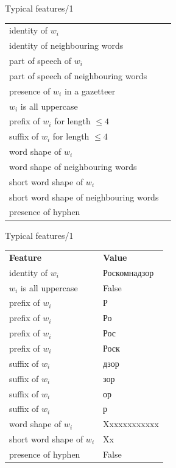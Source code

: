 \documentclass[10pt, compress]{beamer}
\begin{document}


\begin{frame}{Typical features/1}

\begin{tabular}{ll}
identity of $w_i$  &  \\
identity of neighbouring words  &  \\
part of speech of $w_i$  &  \\
part of speech of neighbouring words  &  \\
presence of $w_i$ in a gazetteer &  \\
$w_i$ is all uppercase &  \\
prefix of $w_i$ for length $\le 4$ &  \\
suffix of $w_i$ for length $\le 4$ &  \\
word shape of $w_i$ &  \\
word shape of neighbouring words &  \\
short word shape of $w_i$ \\
short word shape of neighbouring words &  \\
presence of hyphen &  \\

\end{tabular}

\end{frame}

\begin{frame}{Typical features/1}

\begin{tabular}{ll}
\textbf{Feature} & \textbf{Value} \\ 
identity of $w_i$  & Роскомнадзор \\
$w_i$ is all uppercase & False \\
prefix of $w_i$ & Р \\
prefix of $w_i$ & Ро \\
prefix of $w_i$ & Рос \\
prefix of $w_i$ & Роск \\
suffix of $w_i$ & дзор \\
suffix of $w_i$ & зор \\
suffix of $w_i$ & ор \\
suffix of $w_i$ & р \\
word shape of $w_i$ & Xxxxxxxxxxxx \\
short word shape of $w_i$ & Xx \\
presence of hyphen & False  \\

\end{tabular}

\end{frame}
\end{document}
